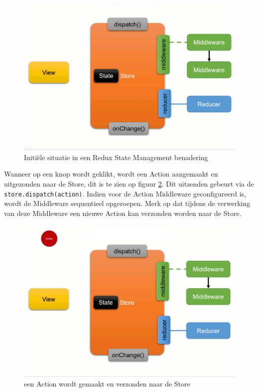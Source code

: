\begin{figure}[H]
    \centering
    \includegraphics[width=\figureWidthModifier\linewidth]{img/stand-van-zaken/redux-working-detailed-1.png}
    \caption{Initiële situatie in een Redux State Management benadering \autocite{Boelens2019}}
    \label{fig:redux-working-detailed-1}
\end{figure}

Wanneer op een knop wordt geklikt, wordt een Action aangemaakt en uitgezonden naar de Store, dit is te zien op figuur \ref{fig:redux-working-detailed-2}. Dit uitzenden gebeurt via de \verb|store.dispatch(action)|. Indien voor de Action Middleware geconfigureerd is, wordt de Middleware sequentieel opgeroepen. Merk op dat tijdens de verwerking van deze Middleware een nieuwe Action kan verzonden worden naar de Store.

\begin{figure}[H]
    \centering
    \includegraphics[width=\figureWidthModifier\linewidth]{img/stand-van-zaken/redux-working-detailed-2.png}
    \caption{een Action wordt gemaakt en verzonden naar de Store \autocite{Boelens2019}}
    \label{fig:redux-working-detailed-2}
\end{figure}

